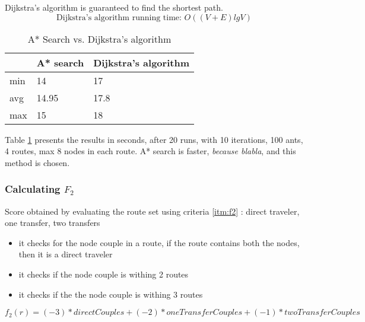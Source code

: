 Dijkstra's algorithm is guaranteed to find the shortest path\cite[p.~661]{cormen09}.
$$\text{Dijkstra's algorithm running time: } O((V + E)lg V)$$

\begin{table}[H]
    \begin{center}
        \begin{tabular}{|l|l|l|}
      \hline
      ~ & A* search & Dijkstra's algorithm\\
      \hline
        min & 14 & 17 \\
        avg & 14.95 & 17.8 \\
        max & 15 & 18 \\
      \hline
        \end{tabular}
    \end{center}
    \caption {A* Search vs. Dijkstra's algorithm}
    \label{table:astarvsdijkstras}
\end{table}

Table \ref{table:astarvsdijkstras} presents the results in seconds, after 20 runs, with 10 iterations, 100 ants, 4 routes, max 8 nodes in each route. A* search is faster, \emph{\color{red} because blabla}, and this method is chosen.
 

\subsubsection{Calculating $F_{2}$}
Score obtained by evaluating the route set using criteria \ref{itm:f2} : direct traveler, one transfer, two transfers


\begin{itemize}
\item it checks for the node couple in a route, if the route contains both the nodes, then it is a direct traveler
\item it checks if the node couple is withing 2 routes
\item it checks if the the node couple is withing 3 routes
\end{itemize}

$f_2(r) = (-3) * directCouples + (-2) * oneTransferCouples + (-1) * twoTransferCouples $

